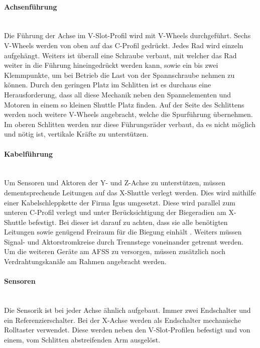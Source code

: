 \paragraph{Achsenführung} \mbox{}\\
Die Führung der Achse im V-Slot-Profil wird mit V-Wheels durchgeführt. Sechs V-Wheels werden von oben auf das C-Profil gedrückt. Jedes Rad wird einzeln aufgehängt. Weiters ist überall eine Schraube verbaut, mit welcher das Rad weiter in die Führung hineingedrückt werden kann, sowie ein bis zwei Klemmpunkte, um bei Betrieb die Last von der Spannschraube nehmen zu können. Durch den geringen Platz im Schlitten ist es durchaus eine Herausforderung, dass all diese Mechanik neben den Spannelementen und Motoren in einem so kleinen Shuttle Platz finden. Auf der Seite des Schlittens werden noch weitere V-Wheels angebracht, welche die Spurführung übernehmen.
Im oberen Schlitten werden nur diese Führungsräder verbaut, da es nicht möglich und nötig ist, vertikale Kräfte zu unterstützen.

\paragraph{Kabelführung} \mbox{}\\
Um Sensoren und Aktoren der Y- und Z-Achse zu unterstützen, müssen dementsprechende Leitungen auf das X-Shuttle verlegt werden. Dies wird mithilfe einer Kabelschleppkette der Firma Igus umgesetzt. Diese wird parallel zum unteren C-Profil verlegt und unter Berücksichtigung der Biegeradien am X-Shuttle befestigt. Bei dieser ist darauf zu achten, dass sie alle benötigten Leitungen sowie genügend Freiraum für die Biegung einhält \cite{igus_freitragend}. Weiters müssen Signal- und Aktorstromkreise durch Trennstege voneinander getrennt werden.
\\
Um die weiteren Geräte am AFSS zu versorgen, müssen zusätzlich noch Verdrahtungskanäle am Rahmen angebracht werden.

\paragraph{Sensoren}\mbox{}\\
Die Sensorik ist bei jeder Achse ähnlich aufgebaut. Immer zwei Endschalter und ein Referenzierschalter. Bei der X-Achse werden als Endschalter mechanische Rolltaster verwendet. Diese werden neben den V-Slot-Profilen befestigt und von einem, vom Schlitten abstreifenden Arm ausgelöst.


